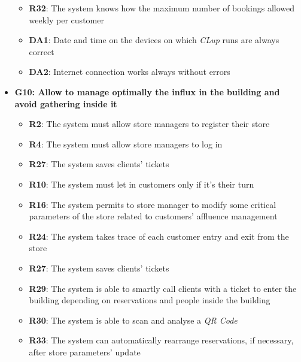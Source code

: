 \documentclass{article}
\begin{document}
\begin{itemize}
\begin{itemize}
						\item {\bfseries R32}: The system knows how the maximum number of bookings allowed weekly per customer\\
						
						\item {\bfseries DA1}: Date and time on the devices on which \emph{CLup} runs are always correct
						\item {\bfseries DA2}: Internet connection works always without errors
					
					\end{itemize}
				
				\item {\bfseries G10: Allow to manage optimally the influx in the building and avoid gathering inside it}	

					\begin{itemize}
						\item {\bfseries R2}: The system must allow store managers to register their store
						\item {\bfseries R4}: The system must allow store managers to log in
						\item {\bfseries R27}: The system saves clients' tickets			
											
						\item {\bfseries R10}: The system must let in customers only if it's their turn
						\item {\bfseries R16}: The system permits to store manager to modify some critical parameters of the store related to customers' affluence management
						\item {\bfseries R24}: The system takes trace of each customer entry and exit from the store
						\item {\bfseries R27}: The system saves clients' tickets				
						\item {\bfseries R29}: The system is able to smartly call clients with a ticket to enter the building depending on reservations and people inside the building
						\item {\bfseries R30}: The system is able to scan and analyse a \emph{QR Code}
						\item{\bfseries R33}: The system can automatically rearrange reservations, if necessary, after store parameters' update \\
		

\end{itemize}
\end{itemize}
\end{document}
